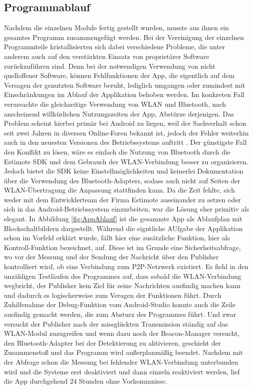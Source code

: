 \subsection{Programmablauf}
Nachdem die einzelnen Module fertig gestellt wurden, musste aus ihnen ein gesamtes Programm zusammengefügt werden. Bei der Vereinigung der einzelnen Programmteile kristallisierten sich dabei verschiedene Probleme, die unter anderem auch auf den verstärkten Einsatz von proprietärer Software zurückzuführen sind. Denn bei der notwendigen Verwendung von nicht quelloffener Software, können Fehlfunktionen der App, die eigentlich auf dem Versagen der genutzten Software beruht, lediglich umgangen oder zumindest mit Einschränkungen im Ablauf der Applikation behoben werden. Im konkreten Fall verursachte die gleichzeitige Verwendung von WLAN und Bluetooth, nach anscheinend willkürlichen Nutzungszeiten der App, Abstürze derjenigen. Das Problem scheint hierbei primär bei Android zu liegen, weil der Sachverhalt schon seit zwei Jahren in diversen Online-Foren bekannt ist, jedoch der Fehler weiterhin auch in den neuesten Versionen des Betriebssystems auftritt \cite{AndWLBT}. Der günstigste Fall den Konflikt zu lösen, wäre es einfach die Nutzung von Bluetooth durch die Estimote SDK und dem Gebrauch der WLAN-Verbindung besser zu organisieren. Jedoch bietet die SDK keine Einstellmöglichkeiten und keinerlei Dokumentation über die Verwendung des Bluetooth-Adapters, sodass auch nicht auf Seiten der WLAN-Übertragung die Anpassung stattfinden kann. Da die Zeit fehlte, sich weder mit dem Entwicklerteam der Firma Estimote auseinander zu setzen oder sich in das Android-Betriebssystem einzurbeiten, war die Lösung eher primitiv als elegant. In Abbildung \ref{fig:AppAblauf} ist die gesammte App als Ablaufplan mit Blockschaltbildern dargestellt. Während die eigntliche AUfgabe der Applikation schon im Vorfeld erklärt wurde, fällt hier eine zusätzliche Funktion, hier als Kontroll-Funktion bezeichnet, auf. Diese ist im Grunde eine Sicherheitsabfrage, wo vor der Messung und der Sendung der Nachricht über den Publisher kontrolliert wird, ob eine Verbindung zum P2P-Netzwerk existiert. Es fiehl in den unzähligen Testläufen des Programmes auf, dass sobald die WLAN-Verbindung wegbricht, der Publisher kein Ziel für seine Nachrichten ausfindig machen kann und dadurch es logischerweise zum Veragen der Funktionen führt. Durch Zuhilfenahme der Debug-Funktion vom Android-Studio konnte auch die Zeile ausfindig gemacht werden, die zum Absturz des Programmes führt. Und zwar versucht der Publisher nach der missglückten Transmission ständig auf das WLAN-Modul zuzugreifen und wenn dazu noch der Beacon-Manager versucht, den Bluetooth-Adapter bei der Detektierung zu aktivieren, geschieht der Zusammenstoß und das Programm wird außerplanmäßig beendet. Nachdem mit der Abfrage schon die Messung bei fehlender WLAN-Verbindung unterbunden wird und die Systeme erst deaktiviert und dann einzeln reaktiviert werden, lief die App durchgehend 24 Stunden ohne Vorkommnisse.   
